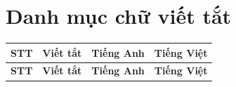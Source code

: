 \clearpage
{}

\chapter*{Danh mục chữ viết tắt}

{\renewcommand{\arraystretch}{1.35}
{\fontsize{12}{14}\selectfont
\begin{longtable}{|C{0.8cm}|p{2.4cm}|p{6.0cm}|p{5.0cm}|}
\hline
\textbf{STT} & \textbf{Viết tắt} & \textbf{Tiếng Anh} & \textbf{Tiếng Việt} \\
\hline
\endfirsthead

\hline
\textbf{STT} & \textbf{Viết tắt} & \textbf{Tiếng Anh} & \textbf{Tiếng Việt} \\
\hline
\endhead


\end{longtable}}}
